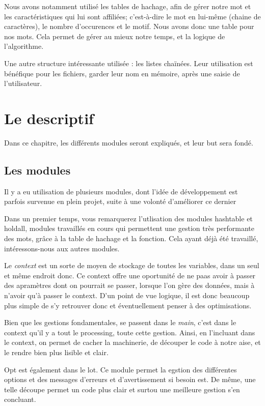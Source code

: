 \documentclass[12pt, letterpaper]{report}
\begin{document}
Nous avons notamment utilisé les tables de hachage, afin de gérer notre mot et les caractéristiques qui lui sont 
affiliées; c'est-à-dire le mot en lui-même (chaine de caractères), le nombre d'occurences et le motif. 
Nous avons donc une table pour nos mots. Cela permet de gérer au mieux notre temps, et la logique 
de l'algorithme.

Une autre structure intéressante utilisée : les listes chaïnées. Leur utilisation est bénéfique pour les fichiers, 
garder leur nom en mémoire, après une saisie de l'utilisateur. 


\chapter{Le descriptif}

Dans ce chapitre, les différents modules seront expliqués, et leur but sera fondé.

\section{Les modules}
Il y a eu utilisation de plusieurs modules, dont l'idée de développement est parfois survenue
en plein projet, suite à une volonté d'améliorer ce dernier

Dans un premier temps, vous remarquerez l'utlisation des modules hashtable et holdall,
modules travaillés en cours qui permettent une gestion très performante des mots, grâce
à la table de hachage et la fonction. Cela ayant déjà été travaillé, intéressons-nous 
aux autres modules.

Le \emph{context} est un sorte de moyen de stockage de toutes les variables, dans un seul
et même endroit donc.
Ce context offre une oportunité de ne paas avoir à passer des apramètres dont on pourrait
se passer, lorsque l'on gère des données, mais à n'avoir qu'à passer le context. 
D'un point de vue logique, il est donc beaucoup plus simple de s'y retrouver
donc et éventuellement penser à des optimisations.

Bien que les gestions fondamentales, se passent dans le \emph{main}, c'est dans le context 
qu'il y a tout le processing, toute cette gestion. Ainsi, en l'incluant dans le context,
on permet de cacher la machinerie, de découper le code à notre aise, et le rendre bien plus lisible
et clair.

Opt est également dans le lot. Ce module permet la egstion des différentes options et des messages d'erreurs et d'avertissement si besoin
est. De même, une telle découpe permet un code plus clair et surtou une meilleure gestion s'en concluant.
\end{document}
